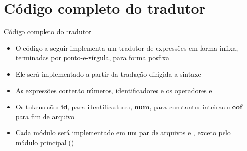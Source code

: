 \section{Código completo do tradutor}

\begin{frame}[fragile]{Código completo do tradutor}

    \begin{itemize}
        \item O código a seguir implementa um tradutor de expressões em forma infixa, terminadas por ponto-e-vírgula, para forma posfixa

        \item Ele será implementado a partir da tradução dirigida a sintaxe

        \item As expressões conterão números, identificadores e os operadores  e 

        \item Os tokens são: \textbf{id}, para identificadores, \textbf{num}, para constantes inteiras e \textbf{eof} para fim de arquivo
        
        \item Cada módulo será implementado em um par de arquivos  e , exceto pelo módulo principal ()
    \end{itemize}

\end{frame}

